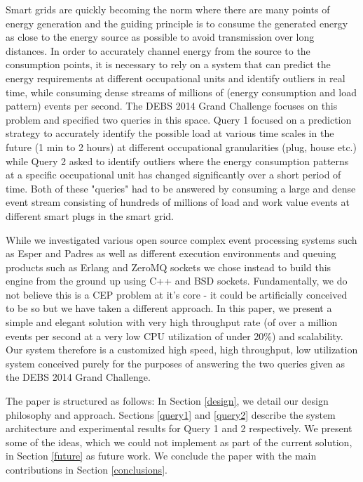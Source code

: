 Smart grids are quickly becoming the norm where there are many points of energy generation and the guiding principle is to consume the generated energy as close to the energy source as possible to avoid transmission over long distances. In order to accurately channel energy from the source to the consumption points, it is necessary to rely on a system that can predict the energy requirements at different occupational units and identify outliers in real time, while consuming dense streams of millions of (energy consumption and load pattern) events per second. The DEBS 2014 Grand Challenge focuses on this problem and specified two queries in this space. Query 1 focused on a prediction strategy to accurately identify the possible load at various time scales in the future (1 min to 2 hours) at different occupational granularities (plug, house etc.) while Query 2 asked to identify outliers where the energy consumption patterns at a specific occupational unit has changed significantly over a short period of time. Both of these "queries" had to be answered by consuming a large and dense event stream consisting of hundreds of millions of load and work value events at different smart plugs in the smart grid. 

While we investigated various open source complex event processing systems such as Esper\cite{Esper} and Padres\cite{Padres} as well as different execution environments and queuing products such as Erlang\cite{erlang} and  ZeroMQ sockets \cite{zeromq} we chose instead to build this engine from the ground up using C++ and BSD sockets. Fundamentally, we do not believe this is a CEP problem at it's core - it could be artificially conceived to be so but we have taken a different approach. In this paper, we present a simple and elegant solution with very high throughput rate (of over a million events per second at a very low CPU utilization of under 20\%) and scalability. Our system therefore is a customized high speed, high throughput, low utilization system conceived purely for the purposes of answering the two queries given as the DEBS 2014 Grand Challenge. 

The paper is structured as follows: In Section \ref{design}, we detail our design philosophy and approach. Sections \ref{query1} and \ref{query2} describe the system architecture and experimental results for Query 1 and 2 respectively. We present some of the ideas, which we could not implement as part of the current solution, in Section \ref{future} as future work. We conclude the paper with the main contributions in Section \ref{conclusions}.
